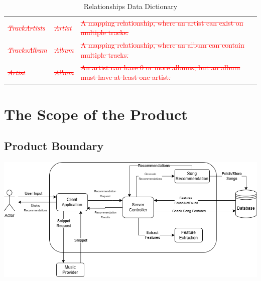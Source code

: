 \documentclass[12pt]{article}
\begin{document}
\begin{table}[htbp!]
\begin{tabular}{ p{.3\linewidth} || p{.3\linewidth} || p{.4\linewidth} }
    \textcolor{red}{\sout{\emph{TrackArtists}}} & \textcolor{red}{\sout{\emph{Artist}}} & \textcolor{red}{\sout{A mapping relationship, where an artist can exist on multiple tracks.}} \\
    \textcolor{red}{\sout{\emph{TracksAlbum}}} & \textcolor{red}{\sout{\emph{Album}}} & \textcolor{red}{\sout{A mapping relationship, where an album can contain multiple tracks.}} \\
    \textcolor{red}{\sout{\emph{Artist}}} & \textcolor{red}{\sout{\emph{Album}}} & \textcolor{red}{\sout{An artist can have 0 or more albums, but an album must have at least one artist.}}
  \end{tabular}
  \label{tbl:relsh-data-dict}
  \caption{Relationships Data Dictionary}
\end{table}
\vspace{1cm}
\section{The Scope of the Product}
\subsection{Product Boundary}
\includegraphics[width=\textwidth]{p_scope.png} \\
\end{document}

